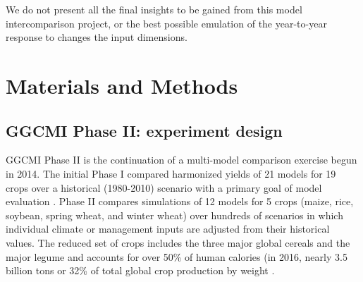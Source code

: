 \documentclass[preprint, 5p, times, twocolumn]{elsarticle}
\begin{document}
We do not present all the final insights to be gained from this model intercomparison project, or the best possible emulation of the year-to-year response to changes the input dimensions.

\section{Materials and Methods}
\label{S:2}
\subsection{GGCMI Phase II: experiment design}
GGCMI Phase II is the continuation of a multi-model comparison exercise begun in 2014. The initial Phase I compared harmonized yields of 21 models for 19 crops over a historical (1980-2010) scenario with a primary goal of model evaluation \citep{Elliott2015, muller_global_2017}. Phase II compares simulations of 12 models for 5 crops (maize, rice, soybean, spring wheat, and winter wheat) over hundreds of scenarios in which individual climate or management inputs are adjusted from their historical values. The reduced set of crops includes the three major global cereals and the major legume and accounts for over 50\% of human calories (in 2016, nearly 3.5 billion tons or 32\% of total global crop production by weight \citep{FAOSTAT}. 
\end{document}
